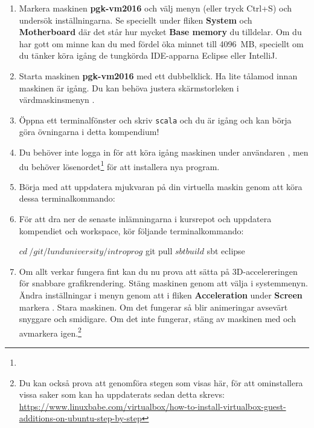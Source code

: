 \begin{enumerate}
\item Markera maskinen \textbf{pgk-vm2016} och välj menyn  (eller tryck Ctrl+S) och undersök inställningarna. Se speciellt under fliken \textbf{System} och \textbf{Motherboard} där det står hur mycket \textbf{Base memory} du tilldelar. Om du har gott om minne kan du med fördel öka minnet till 4096~MB, speciellt om du tänker köra igång de tungkörda IDE-apparna Eclipse eller IntelliJ.

\item Starta maskinen \textbf{pgk-vm2016} med ett dubbelklick. Ha lite tålamod innan maskinen är igång. Du kan behöva justera skärmstorleken i värdmaskinsmenyn .

\item Öppna ett terminalfönster och skriv \texttt{scala} och du är igång och kan börja göra övningarna i detta kompendium!

\item Du behöver inte logga in för att köra igång maskinen under användaren , men du  behöver lösenordet\footnote{} för att installera nya program.

\item Börja med att uppdatera mjukvaran på din virtuella maskin genom att köra dessa terminalkommando:


\item För att dra ner de senaste inlämningarna i kursrepot och uppdatera kompendiet och workspace, kör följande terminalkommando:
\begin{REPLnonum}
$ cd ~/git/lunduniversity/introprog
$ git pull
$ sbt build
$ sbt eclipse
\end{REPLnonum}

\item Om allt verkar fungera fint kan du nu prova att sätta på 3D-accelereringen för snabbare grafikrendering. Stäng maskinen genom att välja  i systemmenyn. Ändra inställningar i menyn  genom att i fliken \textbf{Acceleration} under \textbf{Screen} markera . Stara maskinen. Om det fungerar så blir animeringar avsevärt snyggare och smidigare. Om det inte fungerar, stäng av maskinen med  och avmarkera  igen.\footnote{Du kan också prova att genomföra stegen som visas här, för att ominstallera vissa saker som kan ha uppdaterats sedan detta skrevs: \url{https://www.linuxbabe.com/virtualbox/how-to-install-virtualbox-guest-additions-on-ubuntu-step-by-step}}

\end{enumerate}